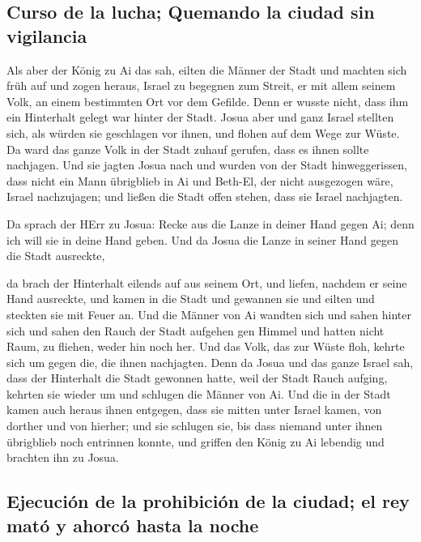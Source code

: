 \hypertarget{curso-de-la-lucha-quemando-la-ciudad-sin-vigilancia}{%
\subsection{Curso de la lucha; Quemando la ciudad sin
vigilancia}\label{curso-de-la-lucha-quemando-la-ciudad-sin-vigilancia}}

 Als aber der König zu Ai das sah, eilten die Männer der
Stadt und machten sich früh auf und zogen heraus, Israel zu begegnen zum
Streit, er mit allem seinem Volk, an einem bestimmten Ort vor dem
Gefilde. Denn er wusste nicht, dass ihm ein Hinterhalt gelegt war hinter
der Stadt.  Josua aber und ganz Israel stellten sich, als
würden sie geschlagen vor ihnen, und flohen auf dem Wege zur Wüste.
 Da ward das ganze Volk in der Stadt zuhauf gerufen, dass
es ihnen sollte nachjagen.  Und sie jagten Josua nach und
wurden von der Stadt hinweggerissen, dass nicht ein Mann übrigblieb in
Ai und Beth-El, der nicht ausgezogen wäre, Israel nachzujagen; und
ließen die Stadt offen stehen, dass sie Israel nachjagten.

 Da sprach der HErr zu Josua: Recke aus die Lanze in
deiner Hand gegen Ai; denn ich will sie in deine Hand geben. Und da
Josua die Lanze in seiner Hand gegen die Stadt ausreckte,

 da brach der Hinterhalt eilends auf aus seinem Ort, und
liefen, nachdem er seine Hand ausreckte, und kamen in die Stadt und
gewannen sie und eilten und steckten sie mit Feuer an. 
Und die Männer von Ai wandten sich und sahen hinter sich und sahen den
Rauch der Stadt aufgehen gen Himmel und hatten nicht Raum, zu fliehen,
weder hin noch her. Und das Volk, das zur Wüste floh, kehrte sich um
gegen die, die ihnen nachjagten.  Denn da Josua und das
ganze Israel sah, dass der Hinterhalt die Stadt gewonnen hatte, weil der
Stadt Rauch aufging, kehrten sie wieder um und schlugen die Männer von
Ai.  Und die in der Stadt kamen auch heraus ihnen
entgegen, dass sie mitten unter Israel kamen, von dorther und von
hierher; und sie schlugen sie, bis dass niemand unter ihnen übrigblieb
noch entrinnen konnte,  und griffen den König zu Ai
lebendig und brachten ihn zu Josua.

\hypertarget{ejecuciuxf3n-de-la-prohibiciuxf3n-de-la-ciudad-el-rey-matuxf3-y-ahorcuxf3-hasta-la-noche}{%
\subsection{Ejecución de la prohibición de la ciudad; el rey mató y
ahorcó hasta la
noche}\label{ejecuciuxf3n-de-la-prohibiciuxf3n-de-la-ciudad-el-rey-matuxf3-y-ahorcuxf3-hasta-la-noche}}

